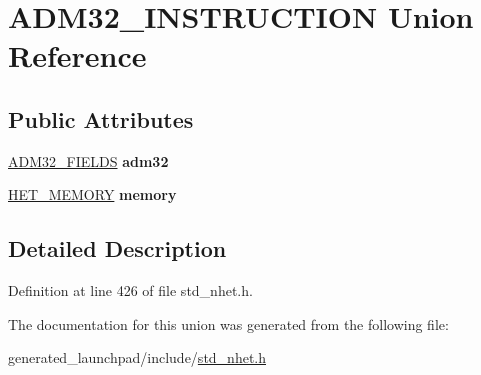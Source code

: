 \hypertarget{unionADM32__INSTRUCTION}{}\section{A\+D\+M32\+\_\+\+I\+N\+S\+T\+R\+U\+C\+T\+I\+ON Union Reference}
\label{unionADM32__INSTRUCTION}
\subsection*{Public Attributes}
\begin{DoxyCompactItemize}
\item 
\mbox{\label{unionADM32__INSTRUCTION_acd255bee58add30ab9376f2a2aac3d7f}} 
\mbox{\hyperlink{structADM32__format}{A\+D\+M32\+\_\+\+F\+I\+E\+L\+DS}} {\bfseries adm32}
\item 
\mbox{\label{unionADM32__INSTRUCTION_ac6faee60bf5e3973542bfba8d6aa5478}} 
\mbox{\hyperlink{structmemory__format}{H\+E\+T\+\_\+\+M\+E\+M\+O\+RY}} {\bfseries memory}
\end{DoxyCompactItemize}


\subsection{Detailed Description}


Definition at line 426 of file std\+\_\+nhet.\+h.



The documentation for this union was generated from the following file\+:\begin{DoxyCompactItemize}
\item 
generated\+\_\+launchpad/include/\mbox{\hyperlink{std__nhet_8h}{std\+\_\+nhet.\+h}}\end{DoxyCompactItemize}
